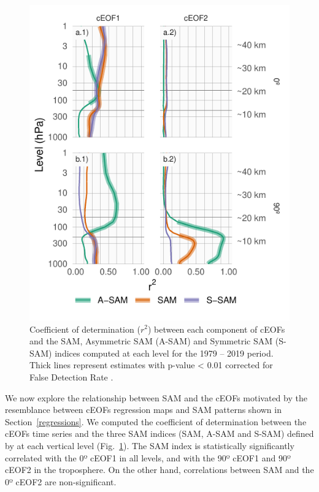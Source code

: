 \documentclass[pdflatex,sn-basic]{sn-jnl}
\theoremstyle{thmstyleone}%
\theoremstyle{thmstyletwo}%
\theoremstyle{thmstylethree}%
\begin{document}
\begin{figure}
\centering
\includegraphics{../figures/sam-eof-vertical-1.pdf}
\caption{\label{fig:sam-eof-vertical}Coefficient of determination (\(r^2\)) between each component of cEOFs and the SAM, Asymmetric SAM (A-SAM) and Symmetric SAM (S-SAM) indices computed at each level for the 1979 -- 2019 period. Thick lines represent estimates with p-value \textless{} 0.01 corrected for False Detection Rate \citep{benjamini1995}.}
\end{figure}

We now explore the relationship between SAM and the cEOFs motivated by the resemblance between cEOFs regression maps and SAM patterns shown in Section~\ref{regressions}.
We computed the coefficient of determination between the cEOFs time series and the three SAM indices (SAM, A-SAM and S-SAM) defined by \citet{campitelli2022} at each vertical level (Fig.~\ref{fig:sam-eof-vertical}).
The SAM index is statistically significantly correlated with the 0º cEOF1 in all levels, and with the 90º cEOF1 and 90º cEOF2 in the troposphere.
On the other hand, correlations between SAM and the 0º cEOF2 are non-significant.
\end{document}
